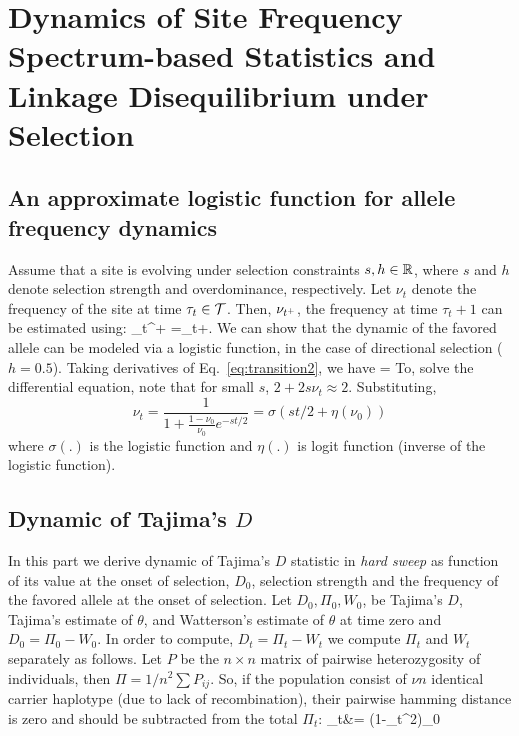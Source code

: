 

\section{Dynamics of Site Frequency Spectrum-based Statistics and Linkage 
	Disequilibrium under Selection }\label{app}
\subsection{An approximate logistic function  for allele frequency dynamics} 
\label{app:af}
Assume that a site is evolving under selection constraints $s,h\in
{\mathbb R}$, where $s$ and $h$ denote selection strength and overdominance,
respectively. Let $\nu_t$ denote the frequency of the site at time
$\tau_t\in {\cal T}$. Then, $\nu_{t^+}$, the frequency at time $\tau_t+1$
can be estimated using:
\beq
\hat{\nu}_{t^+}
=\nu_t+.
  \label{eq:transition2}
\eeq
We can show that the dynamic of the favored allele can be modeled
via a logistic function, in the case of directional selection
($h=0.5$). Taking derivatives of Eq.~\ref{eq:transition2}, we have
\beq {} = 
\eeq To, solve the differential equation, note that for small $s$,
$2+2s\nu_t \approx 2$. Substituting,
\begin{equation}
\nu_t =\frac{1}{1+\frac{1-\nu_0}{\nu_0}e^{-st/2}} = \sigma(st/2+\eta(\nu_0)) 
\label{eq:inf-pop}
\end{equation}
where $\sigma(.)$ is the logistic function and $\eta(.)$ is logit function 
(inverse of the logistic function). 

\subsection{Dynamic of Tajima's $D$}\label{app:td}
In this part we derive dynamic of Tajima's $D$ statistic in \emph{hard
  sweep} as function of its value at the onset of selection, $D_0$,
selection strength and the frequency of the favored allele at the
onset of selection.  Let $D_0, \Pi_0, W_0$, be Tajima's $D$, Tajima's
estimate of $\theta$, and Watterson's estimate of $\theta$ at time
zero and $D_0=\Pi_0 - W_0$.  In order to compute, $D_t=\Pi_t - W_t$ we
compute $\Pi_t$ and $W_t$ separately as follows. Let $P$ be the $n
\times n$ matrix of pairwise heterozygosity of individuals, then
$\Pi={1}/{n^2}\sum P_{ij}$. So, if the population consist of $\nu
n$ identical carrier haplotype (due to lack of recombination), their
pairwise hamming distance is zero and should be subtracted from the
total $\Pi_t$: \beq \Pi_t&= (1-\nu_t^2)\Pi_0 \label{eq:tdt0} \eeq

